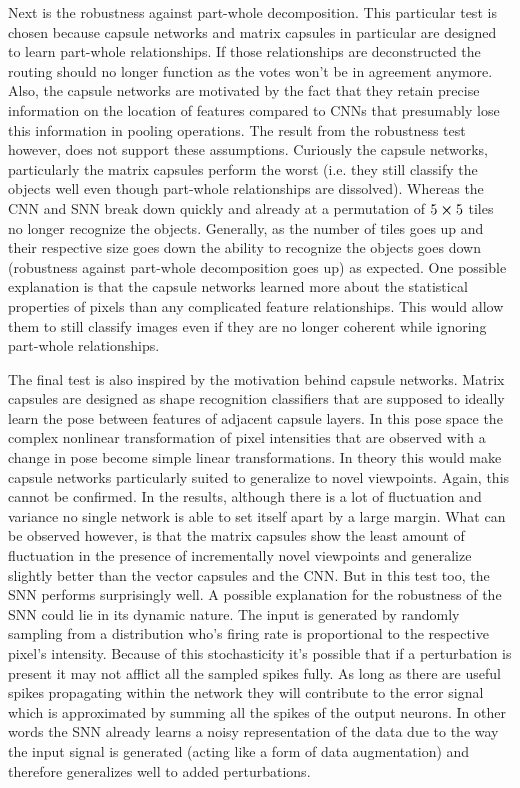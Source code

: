 Next is the robustness against part-whole decomposition. This particular test is chosen because capsule networks and matrix capsules in particular are designed to learn part-whole relationships. If those relationships are deconstructed the routing should no longer function as the votes won’t be in agreement anymore. Also, the capsule networks are motivated by the fact that they retain precise information on the location of features compared to CNNs that presumably lose this information in pooling operations. The result from the robustness test however, does not support these assumptions. Curiously the capsule networks, particularly the matrix capsules perform the worst (i.e. they still classify the objects well even though part-whole relationships are dissolved). Whereas the CNN and SNN break down quickly and already at a permutation of $5\cross 5$ tiles no longer recognize the objects. Generally, as the number of tiles goes up and their respective size goes down the ability to recognize the objects goes down (robustness against part-whole decomposition goes up) as expected. One possible explanation is that the capsule networks learned more about the statistical properties of pixels than any complicated feature relationships. This would allow them to still classify images even if they are no longer coherent while ignoring part-whole relationships.

The final test is also inspired by the motivation behind capsule networks. Matrix capsules are designed as shape recognition classifiers that are supposed to ideally learn the pose between features of adjacent capsule layers. In this pose space the complex nonlinear transformation of pixel intensities that are observed with a change in pose become simple linear transformations. In theory this would make capsule networks particularly suited to generalize to novel viewpoints. Again, this cannot be confirmed. In the results, although there is a lot of fluctuation and variance no single network is able to set itself apart by a large margin. What can be observed however, is that the matrix capsules show the least amount of fluctuation in the presence of incrementally novel viewpoints and generalize slightly better than the vector capsules and the CNN. But in this test too, the SNN performs surprisingly well. A possible explanation for the robustness of the SNN could lie in its dynamic nature. The input is generated by randomly sampling from a distribution who's firing rate is proportional to the respective pixel's intensity. Because of this stochasticity it's possible that if a perturbation is present it may not afflict all the sampled spikes fully. As long as there are useful spikes propagating within the network they will contribute to the error signal which is approximated by summing all the spikes of the output neurons. In other words the SNN already learns a noisy representation of the data due to the way the input signal is generated (acting like a form of data augmentation) and therefore generalizes well to added perturbations.
